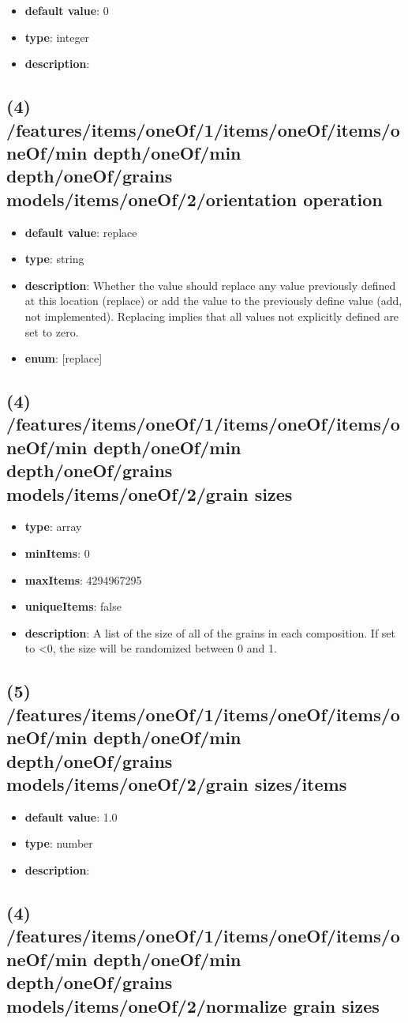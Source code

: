 \begin{itemize}[leftmargin=5em]\item {\bf default value}: 0
\item {\bf type}: integer
\item {\bf description}: 
\end{itemize}\subsection{(4) /features/items/oneOf/1/items/oneOf/items/oneOf/min depth/oneOf/min depth/oneOf/grains models/items/oneOf/2/orientation operation}
\begin{itemize}[leftmargin=4em]\item {\bf default value}: replace
\item {\bf type}: string
\item {\bf description}: Whether the value should replace any value previously defined at this location (replace) or add the value to the previously define value (add, not implemented). Replacing implies that all values not explicitly defined are set to zero.
\item {\bf enum}: [replace]\end{itemize}\subsection{(4) /features/items/oneOf/1/items/oneOf/items/oneOf/min depth/oneOf/min depth/oneOf/grains models/items/oneOf/2/grain sizes}
\begin{itemize}[leftmargin=4em]\item {\bf type}: array
\item {\bf minItems}: 0
\item {\bf maxItems}: 4294967295
\item {\bf uniqueItems}: false
\item {\bf description}: A list of the size of all of the grains in each composition. If set to <0, the size will be randomized between 0 and 1.
\end{itemize}\subsection{(5) /features/items/oneOf/1/items/oneOf/items/oneOf/min depth/oneOf/min depth/oneOf/grains models/items/oneOf/2/grain sizes/items}
\begin{itemize}[leftmargin=5em]\item {\bf default value}: 1.0
\item {\bf type}: number
\item {\bf description}: 
\end{itemize}\subsection{(4) /features/items/oneOf/1/items/oneOf/items/oneOf/min depth/oneOf/min depth/oneOf/grains models/items/oneOf/2/normalize grain sizes}
